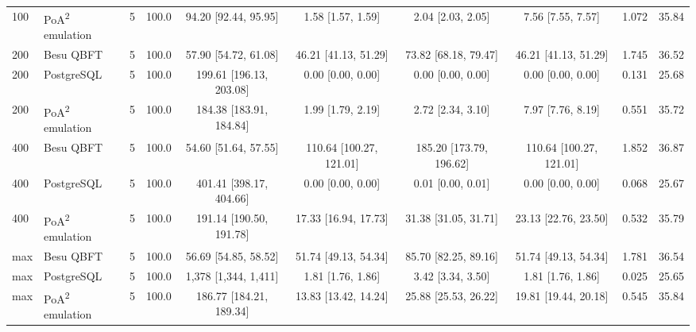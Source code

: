 \begin{table}[t]
{\begin{tabular}{llrrcccccr}
100 & PoA\textsuperscript{2} emulation & 5 & 100.0 & 94.20 [92.44, 95.95] & 1.58 [1.57, 1.59] & 2.04 [2.03, 2.05] & 7.56 [7.55, 7.57] & 1.072 & 35.84 \\
200 & Besu QBFT & 5 & 100.0 & 57.90 [54.72, 61.08] & 46.21 [41.13, 51.29] & 73.82 [68.18, 79.47] & 46.21 [41.13, 51.29] & 1.745 & 36.52 \\
200 & PostgreSQL & 5 & 100.0 & 199.61 [196.13, 203.08] & 0.00 [0.00, 0.00] & 0.00 [0.00, 0.00] & 0.00 [0.00, 0.00] & 0.131 & 25.68 \\
200 & PoA\textsuperscript{2} emulation & 5 & 100.0 & 184.38 [183.91, 184.84] & 1.99 [1.79, 2.19] & 2.72 [2.34, 3.10] & 7.97 [7.76, 8.19] & 0.551 & 35.72 \\
400 & Besu QBFT & 5 & 100.0 & 54.60 [51.64, 57.55] & 110.64 [100.27, 121.01] & 185.20 [173.79, 196.62] & 110.64 [100.27, 121.01] & 1.852 & 36.87 \\
400 & PostgreSQL & 5 & 100.0 & 401.41 [398.17, 404.66] & 0.00 [0.00, 0.00] & 0.01 [0.00, 0.01] & 0.00 [0.00, 0.00] & 0.068 & 25.67 \\
400 & PoA\textsuperscript{2} emulation & 5 & 100.0 & 191.14 [190.50, 191.78] & 17.33 [16.94, 17.73] & 31.38 [31.05, 31.71] & 23.13 [22.76, 23.50] & 0.532 & 35.79 \\
max & Besu QBFT & 5 & 100.0 & 56.69 [54.85, 58.52] & 51.74 [49.13, 54.34] & 85.70 [82.25, 89.16] & 51.74 [49.13, 54.34] & 1.781 & 36.54 \\
max & PostgreSQL & 5 & 100.0 & 1,378 [1,344, 1,411] & 1.81 [1.76, 1.86] & 3.42 [3.34, 3.50] & 1.81 [1.76, 1.86] & 0.025 & 25.65 \\
max & PoA\textsuperscript{2} emulation & 5 & 100.0 & 186.77 [184.21, 189.34] & 13.83 [13.42, 14.24] & 25.88 [25.53, 26.22] & 19.81 [19.44, 20.18] & 0.545 & 35.84 \\
\bottomrule
\end{tabular}}
\end{table}
